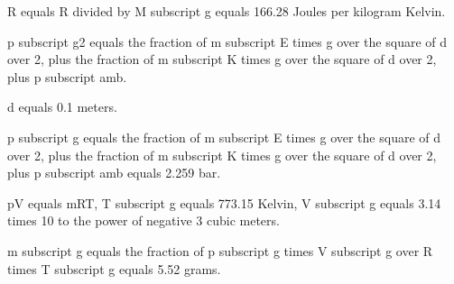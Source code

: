 R equals R divided by M subscript g equals 166.28 Joules per kilogram Kelvin.

p subscript g2 equals the fraction of m subscript E times g over the square of d over 2, plus the fraction of m subscript K times g over the square of d over 2, plus p subscript amb.

d equals 0.1 meters.

p subscript g equals the fraction of m subscript E times g over the square of d over 2, plus the fraction of m subscript K times g over the square of d over 2, plus p subscript amb equals 2.259 bar.

pV equals mRT, T subscript g equals 773.15 Kelvin, V subscript g equals 3.14 times 10 to the power of negative 3 cubic meters.

m subscript g equals the fraction of p subscript g times V subscript g over R times T subscript g equals 5.52 grams.